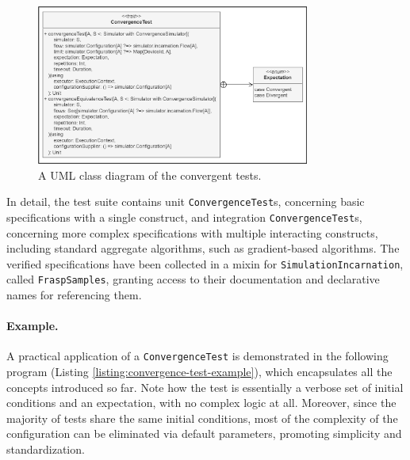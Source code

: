 \begin{figure}[!ht]
  \centering
  \includegraphics[width=0.8\textwidth]{resources/figures/convergence-test-class-diagram.png}
  \caption{A UML class diagram of the convergent tests.}
  \label{figure:convergent-test-class-diagram}
\end{figure}

In detail, the test suite contains unit \texttt{ConvergenceTest}s, concerning
basic specifications with a single construct, and integration
\texttt{ConvergenceTest}s, concerning more complex specifications with multiple
interacting constructs, including standard aggregate algorithms, such as
gradient-based algorithms. The verified specifications have been collected in a
mixin for \texttt{SimulationIncarnation}, called \texttt{FraspSamples},
granting access to their documentation and declarative names for referencing
them.

\paragraph{Example.}
A practical application of a \texttt{ConvergenceTest} is demonstrated in the
following program (Listing \ref{listing:convergence-test-example}), which
encapsulates all the concepts introduced so far. Note how the test is
essentially a verbose set of initial conditions and an expectation, with no
complex logic at all. Moreover, since the majority of tests share the same
initial conditions, most of the complexity of the configuration can be
eliminated via default parameters, promoting simplicity and standardization.


